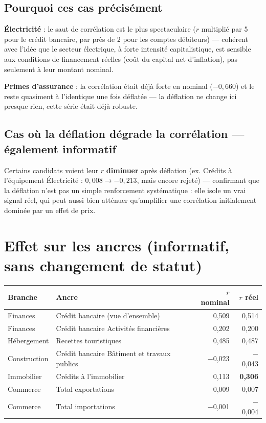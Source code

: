 \documentclass[11pt,a4paper]{article}
\begin{document}
\subsection{Pourquoi ces cas précisément}

\textbf{Électricité} : le saut de corrélation est le plus spectaculaire ($r$ multiplié par 5 pour le crédit bancaire, par près de 2 pour les comptes débiteurs) --- cohérent avec l'idée que le secteur électrique, à forte intensité capitalistique, est sensible aux conditions de financement réelles (coût du capital net d'inflation), pas seulement à leur montant nominal.

\textbf{Primes d'assurance} : la corrélation était déjà forte en nominal ($-0{,}660$) et le reste quasiment à l'identique une fois déflatée --- la déflation ne change ici presque rien, cette série était déjà robuste.

\subsection{Cas où la déflation dégrade la corrélation --- également informatif}

\begin{fichebox}
Certains candidats voient leur $r$ \textbf{diminuer} après déflation (ex. Crédits à l'équipement Électricité : $0{,}008 \to -0{,}213$, mais encore rejeté) --- confirmant que la déflation n'est pas un simple renforcement systématique : elle isole un vrai signal réel, qui peut aussi bien atténuer qu'amplifier une corrélation initialement dominée par un effet de prix.
\end{fichebox}

\section{Effet sur les ancres (informatif, sans changement de statut)}

\begin{center}
\small
\begin{tabular}{p{3cm}p{5.5cm}rr}
\toprule
\textbf{Branche} & \textbf{Ancre} & \textbf{$r$ nominal} & \textbf{$r$ réel} \\
\midrule
Finances & Crédit bancaire (vue d'ensemble) & 0,509 & 0,514 \\
Finances & Crédit bancaire Activités financières & 0,202 & 0,200 \\
Hébergement & Recettes touristiques & 0,485 & 0,487 \\
Construction & Crédit bancaire Bâtiment et travaux publics & $-$0,023 & $-$0,043 \\
Immobilier & Crédits à l'immobilier & 0,113 & \textbf{0,306} \\
Commerce & Total exportations & 0,009 & 0,007 \\
Commerce & Total importations & $-$0,001 & $-$0,004 \\
\bottomrule
\end{tabular}
\end{center}
\end{document}

